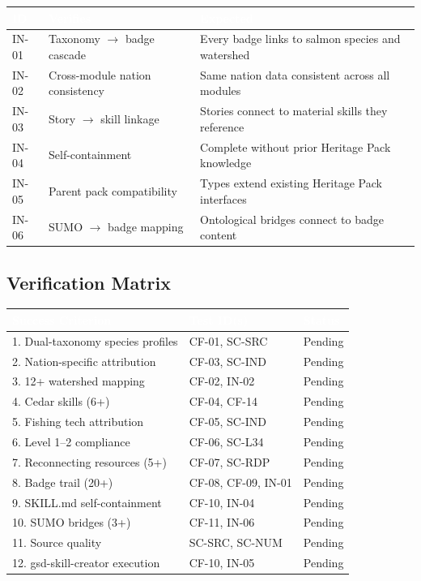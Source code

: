 \documentclass[11pt,letterpaper]{article}
\newcommand{\tableheader}[1]{\textbf{\sffamily\textcolor{white}{#1}}}
\begin{document}
\begin{center}
\begin{tabularx}{\textwidth}{C{1.2cm}L{3.5cm}X}
\toprule
{}
\tableheader{ID} & \tableheader{Verifies} & \tableheader{Expected} \\
\midrule
IN-01 & Taxonomy $\rightarrow$ badge cascade & Every badge links to salmon species and watershed \\
IN-02 & Cross-module nation consistency & Same nation data consistent across all modules \\
IN-03 & Story $\rightarrow$ skill linkage & Stories connect to material skills they reference \\
IN-04 & Self-containment & Complete without prior Heritage Pack knowledge \\
IN-05 & Parent pack compatibility & Types extend existing Heritage Pack interfaces \\
IN-06 & SUMO $\rightarrow$ badge mapping & Ontological bridges connect to badge content \\
\bottomrule
\end{tabularx}
\end{center}

\subsection{Verification Matrix}

\begin{center}
\begin{tabularx}{\textwidth}{XL{3cm}C{1.5cm}}
\toprule
{}
\tableheader{Success Criterion} & \tableheader{Test ID(s)} & \tableheader{Status} \\
. Dual-taxonomy species profiles & CF-01, SC-SRC & Pending \\
2. Nation-specific attribution & CF-03, SC-IND & Pending \\
3. 12+ watershed mapping & CF-02, IN-02 & Pending \\
4. Cedar skills (6+) & CF-04, CF-14 & Pending \\
5. Fishing tech attribution & CF-05, SC-IND & Pending \\
6. Level 1--2 compliance & CF-06, SC-L34 & Pending \\
7. Reconnecting resources (5+) & CF-07, SC-RDP & Pending \\
8. Badge trail (20+) & CF-08, CF-09, IN-01 & Pending \\
9. SKILL.md self-containment & CF-10, IN-04 & Pending \\
10. SUMO bridges (3+) & CF-11, IN-06 & Pending \\
11. Source quality & SC-SRC, SC-NUM & Pending \\
12. gsd-skill-creator execution & CF-10, IN-05 & Pending \\
\bottomrule
\end{tabularx}
\end{center}
\end{document}
